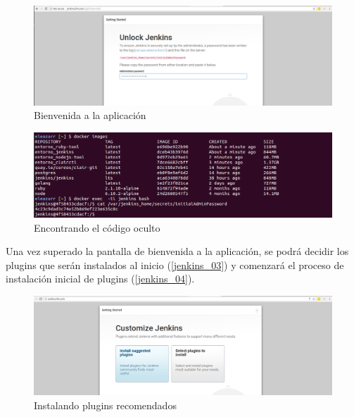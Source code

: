 \begin{figure}[htbp]
	\centering
	\includegraphics[width=1.0\linewidth]
	{desarrollo/figuras/jenkins_01.png}
	\caption{Bienvenida a la aplicación}
	\label{jenkins_01}
\end{figure}


\begin{figure}[!htbp]
	\centering
	\includegraphics[width=1.0\linewidth]
	{desarrollo/figuras/jenkins_02.png}
	\caption{Encontrando el código oculto}
	\label{jenkins_02}
\end{figure}

Una vez superado la pantalla de bienvenida a la aplicación, se podrá decidir los plugins que serán instalados al inicio (\autoref{jenkins_03}) y comenzará el proceso de instalación inicial de plugins (\autoref{jenkins_04}).

\begin{figure}[htbp]
	\centering
	\includegraphics[width=1.0\linewidth]
	{desarrollo/figuras/jenkins_03.png}
	\caption{Instalando plugins recomendados}
	\label{jenkins_03}
\end{figure}

